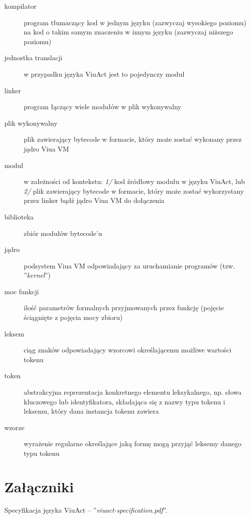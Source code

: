 \documentclass[11pt,oneside,a4paper,titlepage,onecolumn]{article}
\begin{document}
\begin{description}
    \item[kompilator] program tłumaczący kod w jednym języku (zazwyczaj wysokiego poziomu) na kod o takim
        samym znaczeniu w innym języku (zazwyczaj niższego poziomu)
    \item[jednostka translacji] w przypadku języka ViuAct jest to pojedynczy moduł
    \item[linker] program łączący wiele modułów w plik wykonywalny
    \item[plik wykonywalny] plik zawierający bytecode w formacie, który może zostać wykonany przez jądro Viua
        VM
    \item[moduł] w załeżności od kontekstu: \emph{1/} kod źródłowy modułu w języku ViuAct, lub \emph{2/} plik
        zawierający bytecode w formacie, który może zostać wykorzystany przez linker bądź jądro Viua VM do
        dołączenia
    \item[biblioteka] zbiór modułów bytecode'u
    \item[jądro] podsystem Viua VM odpowiadający za uruchamianie programów (tzw. ''\emph{kernel}'')
    \item[moc funkcji] ilość parametrów formalnych przyjmowanych przez funkcję (pojęcie ściągnięte z pojęcia
        mocy zbioru)
    \item[leksem] ciąg znaków odpowiadający wzorcowi określającemu możliwe wartości tokenu
    \item[token] abstrakcyjna reprezentacja konkretnego elementu leksykalnego, np. słowa kluczowego lub
        identyfikatora, składająca się z nazwy typu tokenu i leksemu, który dana instancja tokenu zawiera
    \item[wzorze] wyrażenie regularne określające jaką formę mogą przyjąć leksemy danego typu tokenu
\end{description}

\section{Załączniki}

Specyfikacja języka ViuAct -- ''\emph{viuact-specification.pdf}''.
\end{document}
